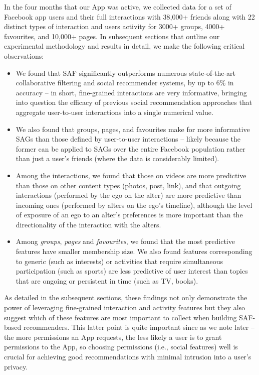 In the four months that our App was active, we collected data for a set of 
Facebook app users and their full interactions with 38,000+ friends along with 22
distinct types of interaction and users activity for 3000+ groups, 4000+ favourites, and 10,000+ pages. 
In subsequent sections that outline our experimental methodology and results in detail, 
we make the following critical observations:
\begin{itemize}
\item We found that SAF significantly 
outperforms numerous state-of-the-art collaborative filtering and social recommender 
systems, by up to 6\% in accuracy -- in short, fine-grained 
interactions are very informative, bringing into question the efficacy of 
previous social recommendation approaches that aggregate user-to-user interactions into 
a single numerical value.
\item We also found that groups, pages, and favourites make for more informative
SAGs than those defined by user-to-user interactions -- likely because the former can be
applied to SAGs over the entire Facebook population 
rather than just a user's friends (where the data is considerably limited).
\item Among the interactions, we found that those on videos are more predictive than those on other content types (photos, post, link), and that outgoing interactions (performed by the ego on the alter) 
are more predictive than incoming ones (performed by alters on the ego's timeline),
although the level of exposure of an ego to an alter's preferences is more 
important than the directionality of the interaction with the alters.
\item %
Among {\em groups}, {\em pages} and {\em favourites}, we found that the most  
predictive features have smaller membership size. We also found features
 corresponding to generic (such as interests) or activities that require 
 simultaneous participation (such as sports) are less predictive of 
 user interest than topics that are ongoing or persistent in time (such as TV, books).
\end{itemize}
As detailed in the subsequent sections, these findings not only
demonstrate the power of leveraging fine-grained interaction and
activity features but they also suggest which of these features are
most important to collect when building SAF-based recommenders.  This
latter point is quite important since as we note later -- the more
permissions an App requests, the less likely a user is to grant
permissions to the App, so choosing permissions (i.e., social
features) well is crucial for achieving good recommendations with
minimal intrusion into a user's privacy.

